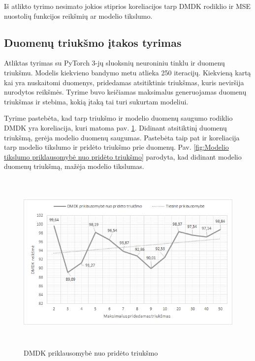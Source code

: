 \documentclass{VUMIFInfBakalaurinis}
\begin{document}
\par Iš atlikto tyrimo nesimato jokios stiprios koreliacijos tarp DMDK rodiklio ir MSE nuostolių funkcijos reikšmių ar modelio tikslumo.

\subsection{Duomenų triukšmo įtakos tyrimas}

\par Atliktas tyrimas su PyTorch 3-jų sluoksnių neuroniniu tinklu ir duomenų triukšmu. Modelis kiekvieno bandymo metu atlieka 250 iteracijų. Kiekvieną kartą kai yra nuskaitomi duomenys, pridedamas atsitiktinis triukšmas, kuris neviršija nurodytos reikšmės. Tyrime buvo keičiamas maksimalus generuojamas duomenų triukšmas ir stebima, kokią įtaką tai turi sukurtam modeliui.
\par Tyrime pastebėta, kad tarp triukšmo ir modelio duomenų saugumo rodiklio DMDK yra koreliacija, kuri matoma pav. \ref{fig:DMDK priklausomybė nuo pridėto triukšmo}. Didinant atsitiktinį duomenų triukšmą, gerėja modelio duomenų saugumas. Pastebėta taip pat ir koreliacija tarp modelio tikslumo ir pridėto triukšmo prie duomenų. Pav. \ref{fig:Modelio tikslumo priklausomybė nuo pridėto triukšmo} parodyta, kad didinant modelio duomenų triukšmą, mažėja modelio tikslumas.

\begin{figure}[h]
  \centering
  \includegraphics[width=13cm,height=9cm,keepaspectratio]{img/tr_tyr_dmdk.png}
  \caption{DMDK priklausomybė nuo pridėto triukšmo}
  \label{fig:DMDK priklausomybė nuo pridėto triukšmo}
\end{figure}
\end{document}
